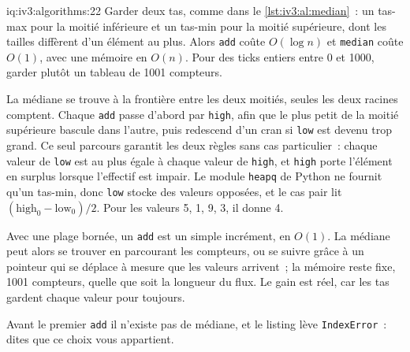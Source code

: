 \begin{solution}{iq:iv3:algorithms:22}
Garder deux tas, comme dans le \cref{lst:iv3:al:median}~: un tas-max pour la moitié inférieure et un tas-min pour la moitié supérieure, dont les tailles diffèrent d'un élément au plus. Alors \texttt{add} coûte $O(\log n)$ et \texttt{median} coûte $O(1)$, avec une mémoire en $O(n)$. Pour des ticks entiers entre 0 et 1000, garder plutôt un tableau de 1001 compteurs.
\label{lst:iv3:al:median}

La médiane se trouve à la frontière entre les deux moitiés, seules les deux racines comptent. Chaque \texttt{add} passe d'abord par \texttt{high}, afin que le plus petit de la moitié supérieure bascule dans l'autre, puis redescend d'un cran si \texttt{low} est devenu trop grand. Ce seul parcours garantit les deux règles sans cas particulier~: chaque valeur de \texttt{low} est au plus égale à chaque valeur de \texttt{high}, et \texttt{high} porte l'élément en surplus lorsque l'effectif est impair. Le module \texttt{heapq} de Python ne fournit qu'un tas-min, donc \texttt{low} stocke des valeurs opposées, et le cas pair lit $(\text{high}_0 - \text{low}_0) / 2$. Pour les valeurs 5, 1, 9, 3, il donne 4.

Avec une plage bornée, un \texttt{add} est un simple incrément, en $O(1)$. La médiane peut alors se trouver en parcourant les compteurs, ou se suivre grâce à un pointeur qui se déplace à mesure que les valeurs arrivent~; la mémoire reste fixe, 1001 compteurs, quelle que soit la longueur du flux. Le gain est réel, car les tas gardent chaque valeur pour toujours.

Avant le premier \texttt{add} il n'existe pas de médiane, et le listing lève \texttt{IndexError}~: dites que ce choix vous appartient.

\end{solution}

